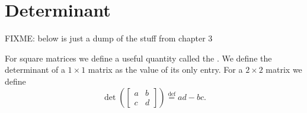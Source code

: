 
\sectionnewpage
\section{Determinant}
\label{det:section}


FIXME: below is just a dump of the stuff from chapter 3

For square matrices we define a useful quantity called the
\emph{}.  We define
the determinant of a $1 \times 1$ matrix as the value of its only entry.
For a $2 \times 2$ matrix we define
\begin{equation*}
\det \left(
\begin{bmatrix}
a & b \\
c & d
\end{bmatrix}
\right)
\overset{\text{def}}{=}
ad-bc .
\end{equation*}

